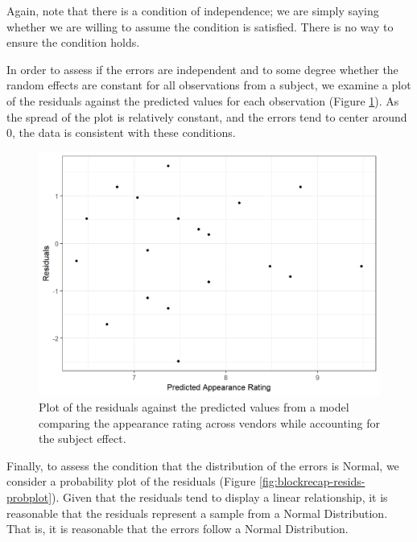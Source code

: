 \documentclass[]{book}
\theoremstyle{plain}
\theoremstyle{mydefn}
\theoremstyle{myexmpl}
\theoremstyle{remark}
\begin{document}
Again, note that there is a condition of independence; we are simply
saying whether we are willing to assume the condition is satisfied.
There is no way to ensure the condition holds.

In order to assess if the errors are independent and to some degree
whether the random effects are constant for all observations from a
subject, we examine a plot of the residuals against the predicted values
for each observation (Figure \ref{fig:blockrecap-resids}). As the spread
of the plot is relatively constant, and the errors tend to center around
0, the data is consistent with these conditions.

\begin{figure}

{\centering \includegraphics[width=0.8\linewidth]{./Images/blockrecap-resids-1} 

}

\caption{Plot of the residuals against the predicted values from a model comparing the appearance rating across vendors while accounting for the subject effect.}\label{fig:blockrecap-resids}
\end{figure}

Finally, to assess the condition that the distribution of the errors is
Normal, we consider a probability plot of the residuals (Figure
\ref{fig:blockrecap-resids-probplot}). Given that the residuals tend to
display a linear relationship, it is reasonable that the residuals
represent a sample from a Normal Distribution. That is, it is reasonable
that the errors follow a Normal Distribution.
\end{document}
